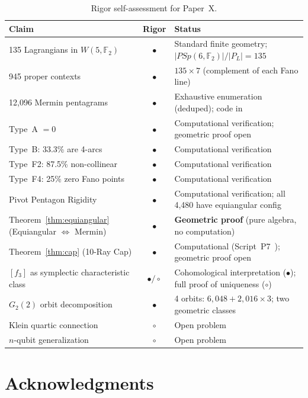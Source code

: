 \documentclass[11pt,a4paper]{article}
\theoremstyle{remark}
\newcommand{\F}{\mathbb{F}}
\begin{document}
\begin{table}[H]
\centering\small
\setlength{\tabcolsep}{4pt}
\begin{tabular}{l c p{6.5cm}}
\toprule
Claim & Rigor & Status \\
\midrule
135 Lagrangians in $W(5, \F_2)$ & $\bullet$ &
  Standard finite geometry; $|PSp(6, \F_2)|/|P_L| = 135$ \\
945 proper contexts & $\bullet$ &
  $135 \times 7$ (complement of each Fano line) \\
12{,}096 Mermin pentagrams & $\bullet$ &
  Exhaustive enumeration (deduped); code in~\cite{PaperXsuppl} \\
Type~A $= 0$ & $\bullet$ &
  Computational verification; geometric proof open \\
Type~B: 33.3\% are 4-arcs & $\bullet$ &
  Computational verification \\
Type~F2: 87.5\% non-collinear & $\bullet$ &
  Computational verification \\
Type~F4: 25\% zero Fano points & $\bullet$ &
  Computational verification \\
Pivot Pentagon Rigidity & $\bullet$ &
  Computational verification; all 4{,}480 have equiangular config \\
Theorem~\ref{thm:equiangular} (Equiangular $\Leftrightarrow$ Mermin) & $\bullet$ &
  \textbf{Geometric proof} (pure algebra, no computation) \\
Theorem~\ref{thm:cap} (10-Ray Cap) & $\bullet$ &
  Computational (Script~P7~\cite{PaperXsuppl}); geometric proof open \\
$[f_3]$ as symplectic characteristic class & $\bullet/\circ$ &
  Cohomological interpretation ($\bullet$); full proof of uniqueness ($\circ$) \\
$G_2(2)$ orbit decomposition & $\bullet$ &
  4 orbits: $6{,}048 + 2{,}016 \times 3$; two geometric classes \\
Klein quartic connection & $\circ$ &
  Open problem \\
$n$-qubit generalization & $\circ$ &
  Open problem \\
\bottomrule
\end{tabular}
\caption{Rigor self-assessment for Paper~X.}
\label{tab:rigor}
\end{table}

\section*{Acknowledgments}
\end{document}
